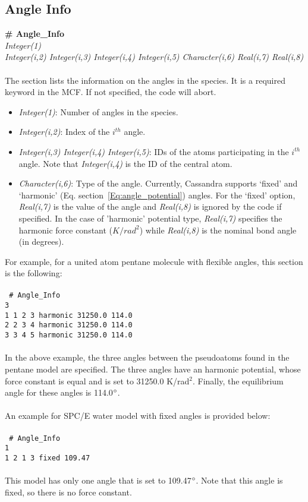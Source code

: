\subsection{Angle Info}\label{sec:Get_Angle_Info}
%
{\bf \# Angle\_Info} \\
%
{\it Integer(1)} \\
%
{\it Integer(i,2) Integer(i,3) Integer(i,4) Integer(i,5)
  Character(i,6) Real(i,7) Real(i,8)} \\ \\
%
The section lists the information on the angles in the species. 
It is a required keyword in the MCF. If not specified, the code
will abort. \\ 
%
\begin{itemize}
\item {\it Integer(1)}: Number of angles in the species. 
%
\item {\it Integer(i,2)}: Index of the $i^{th}$ angle. 
%
\item {\it Integer(i,3) Integer(i,4) Integer(i,5)}: IDs of the atoms
participating in the $i^{th}$ angle. Note that {\it Integer(i,4)} is
the ID of the central atom.
%
\item {\it Character(i,6)}: Type of the angle. Currently,
Cassandra supports `fixed' and `harmonic' (Eq. section~\ref{Eq:angle_potential})
angles. For the `fixed' option, {\it Real(i,7)} is the value of the
angle and {\it Real(i,8)} is ignored by the code if specified. In the
case of 'harmonic' potential type, {\it Real(i,7)} specifies the
harmonic force constant ($K/rad^2$) while {\it Real(i,8)} is the nominal bond
angle (in degrees).

\end{itemize}
For example, for a united atom pentane molecule with flexible angles, this section is the following: \\ \\
%
\texttt{
\# Angle\_Info \\
3 \\
1    1    2    3    harmonic     31250.0    114.0\\
2    2    3    4    harmonic     31250.0    114.0\\
3    3    4    5    harmonic     31250.0    114.0\\
} \\ 
%
In the above example, the three angles between the pseudoatoms found in the pentane model are specified.
The three angles have an harmonic potential, whose force constant is equal and is set to 31250.0 K/rad$^2$.
Finally, the equilibrium angle for these angles is 114.0$\degree$. \\ \\
%
An example for SPC/E water model with fixed angles is provided below: \\ \\
%
\texttt{
\# Angle\_Info \\
1 \\
1    2    1    3   fixed  109.47 \\
} \\
This model has only one angle that is set to 109.47$\degree$. Note that this angle is fixed, so there is no
force constant. 
%
